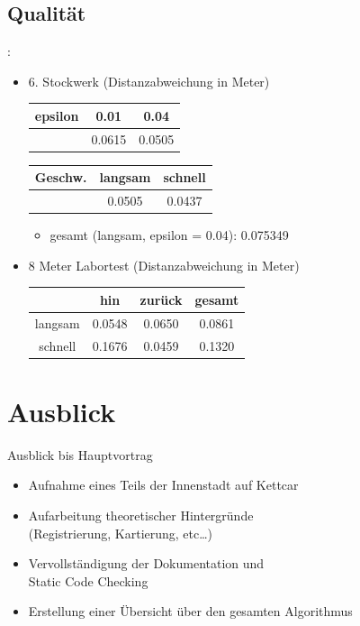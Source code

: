 \documentclass{beamer}
\begin{document}
\subsection{Qualität}
\begin{frame}{\secname: \subsecname}
\begin{itemize}
\item{6. Stockwerk (Distanzabweichung in Meter)}
\begin{center}
\begin{tabular}{ |c|c|c| }
    \hline
    epsilon & 0.01 & 0.04 \\ 
    \hline
    & 0.0615 & 0.0505 \\  
    \hline
\end{tabular}
\end{center}
\begin{center}
\begin{tabular}{ |c|c|c| }
    \hline
    Geschw. & langsam & schnell \\ 
    \hline
    & 0.0505 & 0.0437 \\  
    \hline
\end{tabular}
\end{center}
\begin{itemize}
    \item{gesamt (langsam, epsilon = 0.04): 0.075349}
\end{itemize}
\item{8 Meter Labortest (Distanzabweichung in Meter)}
\begin{center}
\begin{tabular}{ |c|c|c|c| }
    \hline
    & hin & zurück & gesamt \\ 
    \hline
    langsam & 0.0548 & 0.0650 & 0.0861 \\  
    schnell & 0.1676 & 0.0459 & 0.1320 \\
    \hline
\end{tabular}
\end{center}
\end{itemize}

\end{frame}

\section{Ausblick}

\begin{frame}{Ausblick bis Hauptvortrag}
\begin{itemize}
\item{Aufnahme eines Teils der Innenstadt auf Kettcar}
\item{Aufarbeitung theoretischer Hintergründe \\
(Registrierung, Kartierung, etc\dots)}
\item{Vervollständigung der Dokumentation und \\
Static Code Checking}
\item{Erstellung einer Übersicht über den gesamten Algorithmus}
\end{itemize}
\end{frame}
\end{document}
